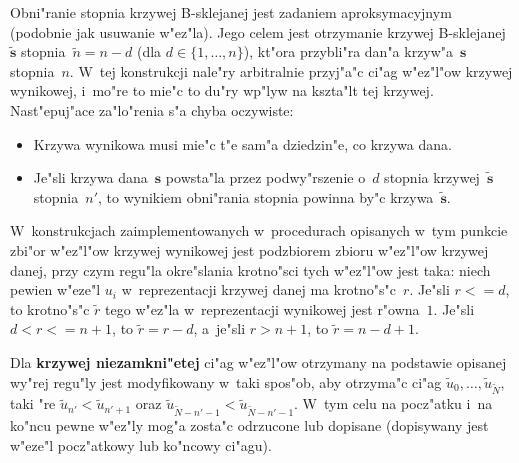 Obni"ranie stopnia krzywej B-sklejanej jest zadaniem aproksymacyjnym
(podobnie jak usuwanie w"ez"la). Jego celem jest otrzymanie krzywej
B-sklejanej~$\tilde{\bm{s}}$ stopnia~$\tilde{n}=n-d$ (dla
$d\in\{1,\ldots,n\}$), kt"ora przybli"ra dan"a krzyw"a~$\bm{s}$ stopnia~$n$.
W~tej konstrukcji nale"ry arbitralnie przyj"a"c ci"ag w"ez"l"ow krzywej
wynikowej, i~mo"re to mie"c to du"ry wp"lyw na kszta"lt tej krzywej.
Nast"epuj"ace za"lo"renia s"a chyba oczywiste:
\begin{itemize}
  \item Krzywa wynikowa musi mie"c t"e sam"a dziedzin"e, co krzywa dana.
  \item Je"sli krzywa dana~$\bm{s}$ powsta"la przez podwy"rszenie o~$d$
    stopnia krzywej~$\tilde{\bm{s}}$ stopnia~$n'$, to wynikiem
    obni"rania stopnia powinna by"c krzywa~$\tilde{\bm{s}}$.
\end{itemize}
W~konstrukcjach zaimplementowanych w~procedurach opisanych w~tym punkcie
zbi"or w"ez"l"ow krzywej wynikowej jest podzbiorem zbioru w"ez"l"ow krzywej
danej, przy czym regu"la okre"slania krotno"sci tych w"ez"l"ow jest taka:
niech pewien w"eze"l $u_i$ w~reprezentacji krzywej danej ma krotno"s"c~$r$.
\pagebreak[2]
Je"sli $r<=d$, to krotno"s"c $\tilde{r}$ tego w"ez"la w~reprezentacji
wynikowej jest r"owna~$1$. Je"sli $d<r<=n+1$, to $\tilde{r}=r-d$,
a~je"sli $r>n+1$, to $\tilde{r}=n-d+1$.

Dla \textbf{krzywej niezamkni"etej} ci"ag w"ez"l"ow otrzymany na
podstawie opisanej wy"rej regu"ly jest modyfikowany w~taki spos"ob, aby
otrzyma"c ci"ag $\tilde{u}_0,\ldots,\tilde{u}_{\tilde{N}}$, taki "re
$\tilde{u}_{n'}<\tilde{u}_{n'+1}$ oraz
$\tilde{u}_{\tilde{N}-n'-1}<\tilde{u}_{\tilde{N}-n'-1}$. W~tym celu
na pocz"atku i~na ko"ncu pewne w"ez"ly mog"a zosta"c odrzucone
lub dopisane (dopisywany jest w"eze"l pocz"atkowy lub ko"ncowy ci"agu).

